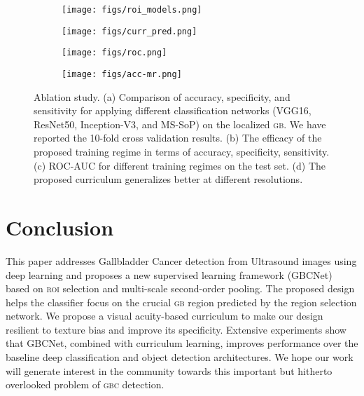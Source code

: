 \documentclass[10pt,twocolumn,letterpaper]{article}
\def\gbc{\textsc{gbc}\xspace}
\def\gb{\textsc{gb}\xspace}
\def\roi{\textsc{roi}\xspace}
\begin{document}
\begin{figure}[t]
	\centering
	\begin{subfigure}[b]{0.49\linewidth}
    \texttt{[image: figs/roi\_models.png]}
    \caption{}
    \label{fig:perf_attn_models}
    \end{subfigure}
	\begin{subfigure}[b]{0.49\linewidth}
		\centering
		\texttt{[image: figs/curr\_pred.png]}
		\caption{}
		\label{fig:ablation1}
	\end{subfigure}
	
	\begin{subfigure}[b]{0.49\linewidth}
		\centering
		\texttt{[image: figs/roc.png]}
		\caption{}
		\label{fig:ablation2}
	\end{subfigure}
		\begin{subfigure}[b]{0.49\linewidth}
		\centering
		\texttt{[image: figs/acc-mr.png]}
		\caption{}
		\label{fig:ablation3}
	\end{subfigure}
	\caption{Ablation study. (a) Comparison of accuracy, specificity, and sensitivity for applying different classification networks (VGG16, ResNet50, Inception-V3, and MS-SoP) on the localized \gb. We have reported the 10-fold cross validation results. (b) The efficacy of the proposed training regime in terms of accuracy, specificity, sensitivity. (c) ROC-AUC for different training regimes on the test set. (d) The proposed curriculum generalizes better at different resolutions. }
	\label{fig:diff_images}
\end{figure} \section{Conclusion}
This paper addresses Gallbladder Cancer detection from Ultrasound images using deep learning and proposes a new supervised learning framework (GBCNet) based on \roi selection and multi-scale second-order pooling. The proposed design helps the classifier focus on the crucial \gb region predicted by the region selection network. We propose a visual acuity-based curriculum to make our design resilient to texture bias and improve its specificity. Extensive experiments show that GBCNet, combined with curriculum learning, improves performance over the baseline deep classification and object detection architectures. We hope our work will generate interest in the community towards this important but hitherto overlooked problem of \gbc detection.
\end{document}

